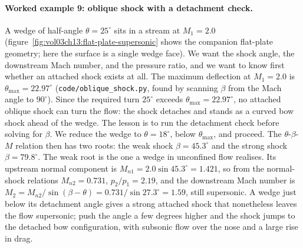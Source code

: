 \paragraph{Worked example 9: oblique shock with a detachment check.}
A wedge of half-angle $\theta = 25^{\circ}$ sits in a stream at
$M_1 = 2.0$ (figure~\ref{fig:vol03ch13:flat-plate-supersonic} shows the
companion flat-plate geometry; here the surface is a single wedge
face). We want the shock angle, the downstream Mach number, and the
pressure ratio, and we want to know first whether an attached shock
exists at all. The maximum deflection at $M_1 = 2.0$ is
$\theta_{\max} = 22.97^{\circ}$ (\texttt{code/oblique\_shock.py},
found by scanning $\beta$ from the Mach angle to $90^{\circ}$). Since
the required turn $25^{\circ}$ exceeds $\theta_{\max} = 22.97^{\circ}$,
no attached oblique shock can turn the flow: the shock detaches and
stands as a curved bow shock ahead of the wedge. The lesson is to run
the detachment check before solving for $\beta$.
 We reduce the wedge to
$\theta = 18^{\circ}$, below $\theta_{\max}$, and proceed. The
$\theta$-$\beta$-$M$ relation then has two roots: the weak shock
$\beta = 45.3^{\circ}$ and the strong shock $\beta = 79.8^{\circ}$. The
weak root is the one a wedge in unconfined flow realises. Its upstream
normal component is $M_{n1} = 2.0 \sin 45.3^{\circ} = 1.421$, so from
the normal-shock relations $M_{n2} = 0.731$, $p_2/p_1 = 2.19$, and the
downstream Mach number is
$M_2 = M_{n2}/\sin(\beta - \theta) = 0.731/\sin 27.3^{\circ} = 1.59$,
still supersonic. A wedge just below its detachment angle gives a
strong attached shock that nonetheless leaves the flow supersonic; push
the angle a few degrees higher and the shock jumps to the detached bow
configuration, with subsonic flow over the nose and a large rise in
drag.


